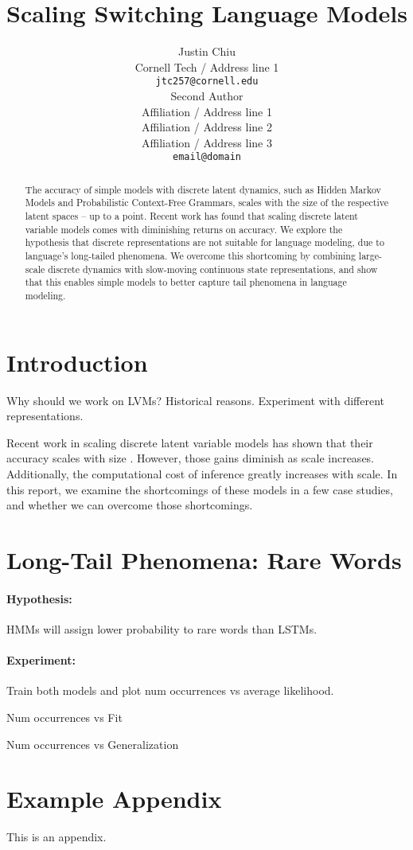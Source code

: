 \documentclass[11pt]{article}
\title{Scaling Switching Language Models}
\author{Justin Chiu \\
  Cornell Tech / Address line 1 \\
  \texttt{jtc257@cornell.edu} \\\And
  Second Author \\
  Affiliation / Address line 1 \\
  Affiliation / Address line 2 \\
  Affiliation / Address line 3 \\
  \texttt{email@domain} \\}
\begin{document}
\maketitle
\begin{abstract}
The accuracy of simple models with discrete latent dynamics,
such as Hidden Markov Models and Probabilistic Context-Free Grammars,
scales with the size of the respective latent spaces -- up to a point.
Recent work has found that scaling discrete latent variable models comes with diminishing returns on accuracy.
We explore the hypothesis that discrete representations are not suitable for language modeling,
due to language's long-tailed phenomena.
We overcome this shortcoming by combining large-scale discrete dynamics
with slow-moving continuous state representations,
and show that this enables simple models to better capture tail phenomena in language modeling.
\end{abstract}

\section{Introduction}
Why should we work on LVMs?
Historical reasons.
Experiment with different representations.

Recent work in scaling discrete latent variable models has shown that their accuracy scales with size \citep{chiu-rush-2020-scaling,yang-etal-2021-pcfgs}.
However, those gains diminish as scale increases.
Additionally, the computational cost of inference greatly increases with scale.
In this report, we examine the shortcomings of these models in a few case studies,
and whether we can overcome those shortcomings.

\section{Long-Tail Phenomena: Rare Words}
\paragraph{Hypothesis:} HMMs will assign lower probability to rare words than LSTMs.
\paragraph{Experiment:} Train both models and plot num occurrences vs average likelihood.

Num occurrences vs Fit

Num occurrences vs Generalization





\appendix

\section{Example Appendix}
\label{sec:appendix}

This is an appendix.
\end{document}
